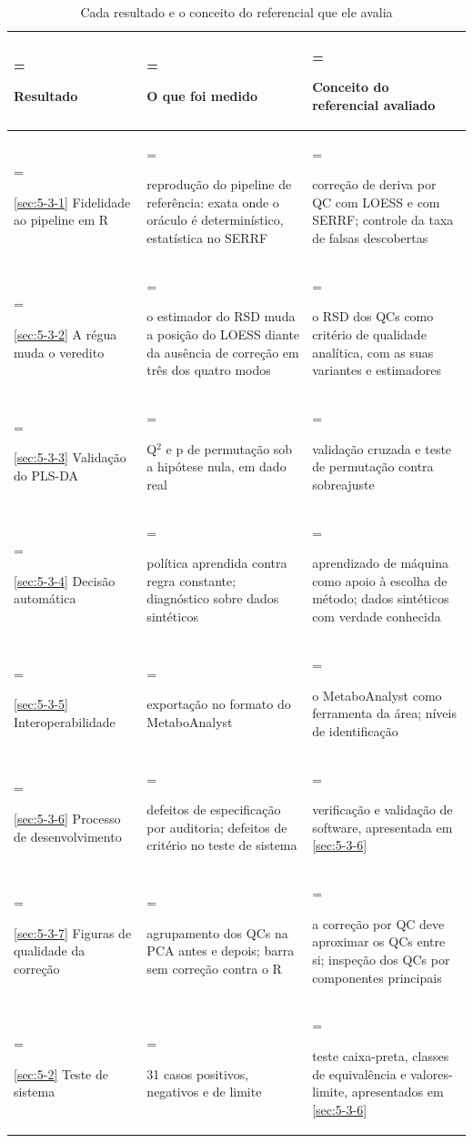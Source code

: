 \begin{table}[htbp]
\centering
\caption{Cada resultado e o conceito do referencial que ele avalia}\label{qua:5-1}
\normalsize
\begin{tabularx}{\linewidth}{|>{\hsize=0.72\hsize\linewidth=\hsize\raggedright\arraybackslash\hspace{0pt}}X|>{\hsize=1.14\hsize\linewidth=\hsize\raggedright\arraybackslash\hspace{0pt}}X|>{\hsize=1.14\hsize\linewidth=\hsize\raggedright\arraybackslash\hspace{0pt}}X|}
\hline
\textbf{Resultado} & \textbf{O que foi medido} & \textbf{Conceito do referencial avaliado} \\
\hline
\ref{sec:5-3-1} Fidelidade ao pipeline em R & reprodução do pipeline de referência: exata onde o oráculo é determinístico, estatística no SERRF & correção de deriva por QC com LOESS e com SERRF; controle da taxa de falsas descobertas \\ \hline
\ref{sec:5-3-2} A régua muda o veredito & o estimador do RSD muda a posição do LOESS diante da ausência de correção em três dos quatro modos & o RSD dos QCs como critério de qualidade analítica, com as suas variantes e estimadores \\ \hline
\ref{sec:5-3-3} Validação do PLS-DA & Q$^{2}$ e p de permutação sob a hipótese nula, em dado real & validação cruzada e teste de permutação contra sobreajuste \\ \hline
\ref{sec:5-3-4} Decisão automática & política aprendida contra regra constante; diagnóstico sobre dados sintéticos & aprendizado de máquina como apoio à escolha de método; dados sintéticos com verdade conhecida \\ \hline
\ref{sec:5-3-5} Interoperabilidade & exportação no formato do MetaboAnalyst & o MetaboAnalyst como ferramenta da área; níveis de identificação \\ \hline
\ref{sec:5-3-6} Processo de desenvolvimento & defeitos de especificação por auditoria; defeitos de critério no teste de sistema & verificação e validação de software, apresentada em \ref{sec:5-3-6} \\ \hline
\ref{sec:5-3-7} Figuras de qualidade da correção & agrupamento dos QCs na PCA antes e depois; barra sem correção contra o R & a correção por QC deve aproximar os QCs entre si; inspeção dos QCs por componentes principais \\ \hline
\ref{sec:5-2} Teste de sistema & 31 casos positivos, negativos e de limite & teste caixa-preta, classes de equivalência e valores-limite, apresentados em \ref{sec:5-3-6} \\ \hline
\end{tabularx}
\end{table}

